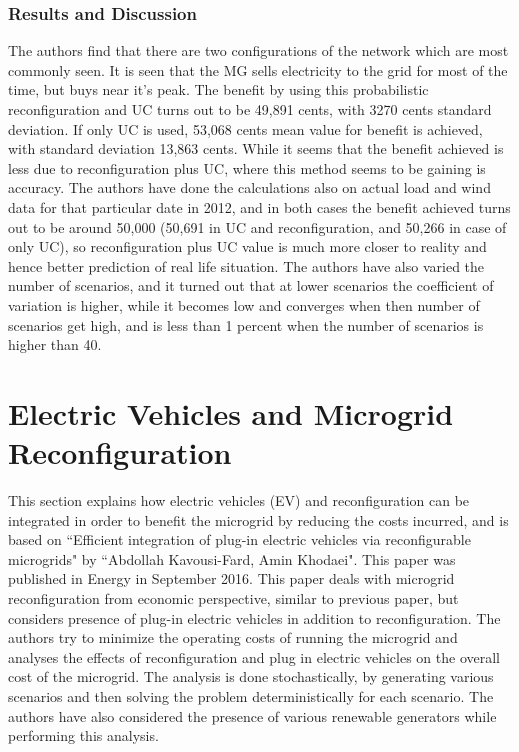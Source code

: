 \subsubsection{Results and Discussion}
The authors find that there are two configurations of the network which are most commonly seen. It is seen that the MG sells electricity to the grid for most of the time, but buys near it's peak. The benefit by using this probabilistic reconfiguration and UC turns out to be 49,891 cents, with 3270 cents standard deviation. If only UC is used, 53,068 cents mean value for benefit is achieved, with standard deviation 13,863 cents. While it seems that the benefit achieved is less due to reconfiguration plus UC, where this method seems to be gaining is accuracy. The authors have done the calculations also on actual load and wind data for that particular date in 2012, and in both cases the benefit achieved turns out to be around 50,000 (50,691 in UC and reconfiguration, and 50,266 in case of only UC), so reconfiguration plus UC value is much more closer to reality and hence better prediction of real life situation. The authors have also varied the number of scenarios, and it turned out that at lower scenarios the coefficient of variation is higher, while it becomes low and converges when then number of scenarios get high, and is less than 1 percent when the number of scenarios is higher than 40.



\section{Electric Vehicles and Microgrid Reconfiguration}\label{ch3sec2}
This section explains how electric vehicles (EV) and reconfiguration can be integrated in order to benefit the microgrid by reducing the costs incurred, and is based on ``Efficient integration of plug-in electric vehicles via reconfigurable microgrids" by ``Abdollah Kavousi-Fard, Amin Khodaei"\citep{Kavousi-Fard2016653}. This paper was published in Energy in September 2016. This paper deals with microgrid reconfiguration from economic perspective, similar to previous paper, but considers presence of plug-in electric vehicles in addition to reconfiguration. The authors try to minimize the operating costs of running the microgrid and analyses the effects of reconfiguration and plug in electric vehicles on the overall cost of the microgrid. The analysis is done stochastically, by generating various scenarios and then solving the problem deterministically for each scenario. The authors have also considered the presence of various renewable generators while performing this analysis.
